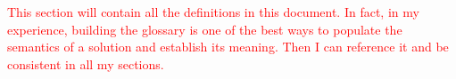 
\textcolor{red}{This section will contain all the definitions in this document. In fact, in my experience, building the glossary is one of the best ways to populate the semantics of a solution and establish its meaning. Then I can reference it and be consistent in all my sections.}